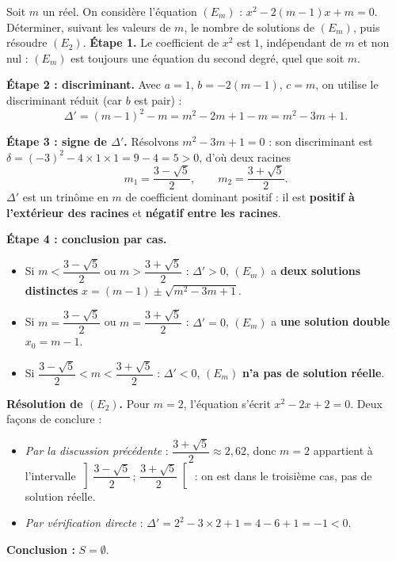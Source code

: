 \documentclass[11pt]{article}
\begin{document}
\begin{exoresolu}
Soit $m$ un réel. On considère l'équation $(E_m)$ : $x^2-2(m-1)x+m=0$.
Déterminer, suivant les valeurs de $m$, le nombre de solutions de $(E_m)$, puis résoudre $(E_2)$.
\tcblower
\textbf{Étape 1.} Le coefficient de $x^2$ est $1$, indépendant de $m$ et non nul : $(E_m)$ est toujours une équation du second degré, quel que soit $m$.

\textbf{Étape 2 : discriminant.} Avec $a=1$, $b=-2(m-1)$, $c=m$, on utilise le discriminant réduit (car $b$ est pair) :
\[ \Delta' = (m-1)^2 - m = m^2 - 2m + 1 - m = m^2 - 3m + 1. \]

\textbf{Étape 3 : signe de $\Delta'$.} Résolvons $m^2-3m+1=0$ : son discriminant est $\delta = (-3)^2-4\times 1\times 1 = 9-4 = 5 > 0$, d'où deux racines
\[ m_1 = \frac{3-\sqrt{5}}{2}, \qquad m_2 = \frac{3+\sqrt{5}}{2}. \]
$\Delta'$ est un trinôme en $m$ de coefficient dominant positif : il est \textbf{positif à l'extérieur des racines} et \textbf{négatif entre les racines}.

\textbf{Étape 4 : conclusion par cas.}
\begin{itemize}
\item Si $m < \dfrac{3-\sqrt{5}}{2}$ ou $m > \dfrac{3+\sqrt{5}}{2}$ : $\Delta'>0$, $(E_m)$ a \textbf{deux solutions distinctes} $x = (m-1) \pm \sqrt{m^2-3m+1}$.
\item Si $m = \dfrac{3-\sqrt{5}}{2}$ ou $m = \dfrac{3+\sqrt{5}}{2}$ : $\Delta'=0$, $(E_m)$ a \textbf{une solution double} $x_0 = m-1$.
\item Si $\dfrac{3-\sqrt{5}}{2} < m < \dfrac{3+\sqrt{5}}{2}$ : $\Delta'<0$, $(E_m)$ \textbf{n'a pas de solution réelle}.
\end{itemize}

\textbf{Résolution de $(E_2)$.} Pour $m=2$, l'équation s'écrit $x^2 - 2x + 2 = 0$. Deux façons de conclure :
\begin{itemize}
\item \emph{Par la discussion précédente} : $\dfrac{3+\sqrt{5}}{2} \approx 2{,}62$, donc $m=2$ appartient à l'intervalle $\left]\dfrac{3-\sqrt{5}}{2}\,;\,\dfrac{3+\sqrt{5}}{2}\right[$ : on est dans le troisième cas, pas de solution réelle.
\item \emph{Par vérification directe} : $\Delta' = 2^2 - 3\times 2 + 1 = 4-6+1 = -1 < 0$.
\end{itemize}
\textbf{Conclusion :} $S = \emptyset$.
\end{exoresolu}
\end{document}
